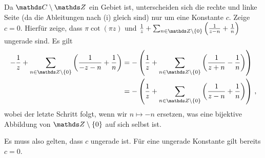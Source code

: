 \begin{bewe}
\begin{enumerate}
Da $\CC\setminus\ZZ$ ein Gebiet ist, unterscheiden sich die rechte und linke Seite (da die Ableitungen nach (i) gleich sind) nur um eine Konstante $c$.
Zeige $c=0$.
Hierfür zeige, dass $\pi \cot(\pi z)$ und $\frac{1}{z} + \sum _{n \in \ZZ\setminus\{0\}} \left( \frac{1}{z-n} + \frac{1}{n}\right)$ ungerade sind.
Es gilt
\begin{align*}
	-\frac{1}{z} + \sum _{n \in \ZZ\setminus\{0\}} \left( \frac{1}{-z-n} + \frac{1}{n}\right)
	&= - \left(\frac{1}{z} + \sum _{n \in \ZZ\setminus\{0\}} \left( \frac{1}{z+n} - \frac{1}{n}\right)\right) \\
	&= - \left(\frac{1}{z} + \sum _{n \in \ZZ\setminus\{0\}} \left( \frac{1}{z-n} + \frac{1}{n}\right)\right)
	\,,
\end{align*}
wobei der letzte Schritt folgt, wenn wir $n \mapsto -n$ ersetzen, was eine bijektive Abbildung von $\ZZ \setminus\{0\}$ auf sich selbst ist.

Es muss also gelten, dass $c$ ungerade ist.
Für eine ungerade Konstante gilt bereits $c=0$.
\end{enumerate}
\end{bewe}